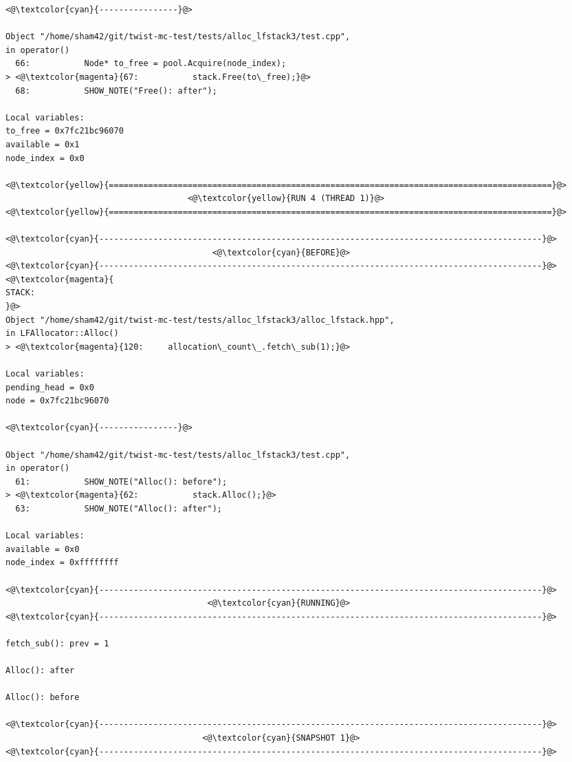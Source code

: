 \begin{adjustwidth}{-3.3cm}{-1cm}
\begin{allintypewriter}
\begin{multicols*}{2}
\begin{lstlisting}[numbers=none]
<@\textcolor{cyan}{----------------}@>

Object "/home/sham42/git/twist-mc-test/tests/alloc_lfstack3/test.cpp",
in operator()
  66:           Node* to_free = pool.Acquire(node_index);
> <@\textcolor{magenta}{67:           stack.Free(to\_free);}@>
  68:           SHOW_NOTE("Free(): after");

Local variables: 
to_free = 0x7fc21bc96070
available = 0x1
node_index = 0x0

<@\textcolor{yellow}{==========================================================================================}@>
                                     <@\textcolor{yellow}{RUN 4 (THREAD 1)}@>
<@\textcolor{yellow}{==========================================================================================}@>

<@\textcolor{cyan}{------------------------------------------------------------------------------------------}@>
                                          <@\textcolor{cyan}{BEFORE}@>
<@\textcolor{cyan}{------------------------------------------------------------------------------------------}@>
<@\textcolor{magenta}{
STACK:
}@>
Object "/home/sham42/git/twist-mc-test/tests/alloc_lfstack3/alloc_lfstack.hpp",
in LFAllocator::Alloc()
> <@\textcolor{magenta}{120:     allocation\_count\_.fetch\_sub(1);}@>

Local variables: 
pending_head = 0x0
node = 0x7fc21bc96070

<@\textcolor{cyan}{----------------}@>

Object "/home/sham42/git/twist-mc-test/tests/alloc_lfstack3/test.cpp",
in operator()
  61:           SHOW_NOTE("Alloc(): before");
> <@\textcolor{magenta}{62:           stack.Alloc();}@>
  63:           SHOW_NOTE("Alloc(): after");

Local variables: 
available = 0x0
node_index = 0xffffffff

<@\textcolor{cyan}{------------------------------------------------------------------------------------------}@>
                                         <@\textcolor{cyan}{RUNNING}@>
<@\textcolor{cyan}{------------------------------------------------------------------------------------------}@>

fetch_sub(): prev = 1

Alloc(): after

Alloc(): before

<@\textcolor{cyan}{------------------------------------------------------------------------------------------}@>
                                        <@\textcolor{cyan}{SNAPSHOT 1}@>
<@\textcolor{cyan}{------------------------------------------------------------------------------------------}@>


\end{lstlisting}
\end{multicols*}
\end{allintypewriter}
\end{adjustwidth}
